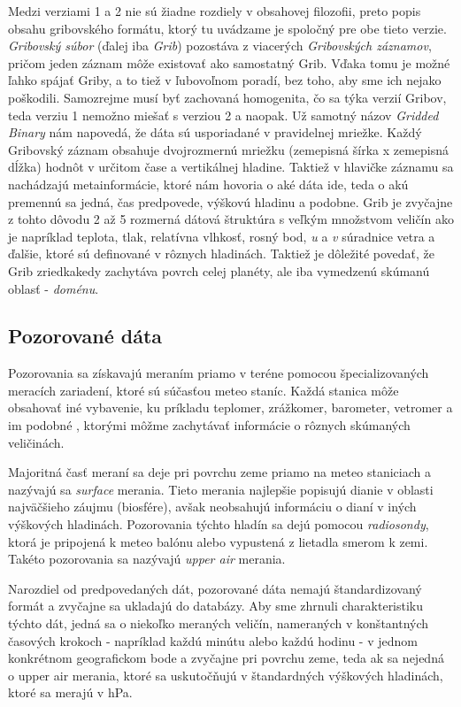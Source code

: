 Medzi verziami 1 a 2 nie sú žiadne rozdiely v obsahovej filozofii, preto popis obsahu gribovského formátu, ktorý tu uvádzame je spoločný pre obe tieto verzie. 
\textit{Gribovský súbor} (ďalej iba \textit{Grib}) pozostáva z viacerých \textit{Gribovských záznamov}, pričom jeden záznam môže existovať ako samostatný Grib. Vďaka tomu je možné ľahko spájať Griby, a to tiež v ľubovoľnom poradí, bez toho, aby sme ich nejako poškodili. Samozrejme musí byť zachovaná homogenita, čo sa týka verzií Gribov, teda verziu 1 nemožno miešať s verziou 2 a naopak.
Už samotný názov \textit{Gridded Binary} nám napovedá, že dáta sú usporiadané v pravidelnej mriežke. Každý Gribovský záznam obsahuje dvojrozmernú mriežku (zemepisná šírka x zemepisná dĺžka) hodnôt v určitom čase a vertikálnej hladine. Taktiež v hlavičke záznamu sa nachádzajú metainformácie, ktoré nám hovoria o aké dáta ide, teda o akú premennú sa jedná, čas predpovede, výškovú hladinu a podobne. Grib je zvyčajne z tohto dôvodu 2 až 5 rozmerná dátová štruktúra s veľkým množstvom veličín ako je napríklad teplota, tlak, relatívna vlhkosť, rosný bod, \textit{u} a \textit{v} súradnice vetra a ďalšie, ktoré sú definované v rôznych hladinách. Taktiež je dôležité povedať, že Grib zriedkakedy zachytáva povrch celej planéty, ale iba vymedzenú skúmanú oblasť - \textit{doménu}.

\subsection{Pozorované dáta}
Pozorovania sa získavajú meraním priamo v teréne pomocou špecializovaných meracích zariadení, ktoré sú súčasťou meteo staníc. Každá stanica môže obsahovať iné vybavenie, ku príkladu teplomer, zrážkomer, barometer, vetromer a im podobné \cite{WeatherStation}, ktorými môžme zachytávať informácie o rôznych skúmaných veličinách. 

Majoritná časť meraní sa deje pri povrchu zeme priamo na meteo staniciach a nazývajú sa \textit{surface} merania. Tieto merania najlepšie popisujú dianie v oblasti najväčšieho záujmu (biosfére), avšak neobsahujú informáciu o dianí v iných výškových hladinách. Pozorovania týchto hladín sa dejú pomocou \textit{radiosondy}, ktorá je pripojená k meteo balónu alebo vypustená z lietadla smerom k zemi. Takéto pozorovania sa nazývajú \textit{upper air} merania.

Narozdiel od predpovedaných dát, pozorované dáta nemajú štandardizovaný formát a zvyčajne sa ukladajú do databázy.
Aby sme zhrnuli charakteristiku týchto dát, jedná sa o niekoľko meraných veličín, nameraných v konštantných časových krokoch - napríklad každú minútu alebo každú hodinu - v jednom konkrétnom geografickom bode a zvyčajne pri povrchu zeme, teda ak sa nejedná o upper air merania, ktoré sa uskutočňujú v štandardných výškových hladinách, ktoré sa merajú v hPa.

